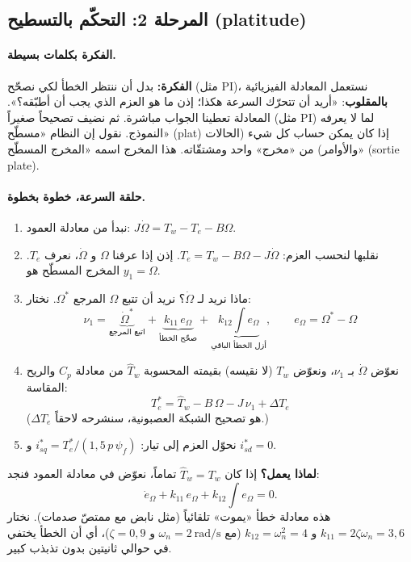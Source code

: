 \documentclass[11pt,a4paper]{article}
\newcommand{\fr}[1]{\textfrench{#1}}
\newcommand{\Fikra}{\textbf{الفكرة: }}
\begin{document}
\subsection{المرحلة 2: التحكّم بالتسطيح (\fr{platitude})}

\paragraph{الفكرة بكلمات بسيطة.}
\begin{fikra}
\Fikra
بدل أن ننتظر الخطأ لكي نصحّح (مثل \fr{PI})، نستعمل المعادلة الفيزيائية \textbf{بالمقلوب}:
«أريد أن تتحرّك السرعة هكذا؛ إذن ما هو العزم الذي يجب أن أطبّقه؟». المعادلة تعطينا الجواب مباشرة.
ثم نضيف تصحيحاً صغيراً (مثل \fr{PI}) لما لا يعرفه النموذج.
نقول إن النظام «مسطّح» (\fr{plat}) إذا كان يمكن حساب كل شيء (الحالات والأوامر) من «مخرج» واحد
ومشتقّاته. هذا المخرج اسمه «المخرج المسطّح» (\fr{sortie plate}).
\end{fikra}

\paragraph{حلقة السرعة، خطوة بخطوة.}
\begin{enumerate}
\item نبدأ من معادلة العمود: $J\dot\Omega = T_w - T_e - B\Omega$.
\item نقلبها لنحسب العزم: $T_e = T_w - B\Omega - J\dot\Omega$.
إذن إذا عرفنا $\Omega$ و $\dot\Omega$، نعرف $T_e$. المخرج المسطّح هو $y_1=\Omega$.
\item ماذا نريد لـ $\dot\Omega$؟ نريد أن تتبع $\Omega$ المرجع $\Omega^*$. نختار:
\[
\nu_1 = \underbrace{\dot\Omega^*}_{\text{اتبع المرجع}} + \underbrace{k_{11}\,e_\Omega}_{\text{صحّح الخطأ}} + \underbrace{k_{12}\!\int\! e_\Omega}_{\text{أزل الخطأ الباقي}},
\qquad e_\Omega = \Omega^* - \Omega
\]
\item نعوّض $\dot\Omega$ بـ $\nu_1$، ونعوّض $T_w$ (لا نقيسه) بقيمته المحسوبة $\hat T_w$ من معادلة $C_p$ والريح المقاسة:
\begin{equation}
\boxed{T_e^* = \hat T_w - B\,\Omega - J\,\nu_1 + \Delta T_e}
\end{equation}
($\Delta T_e$ هو تصحيح الشبكة العصبونية، سنشرحه لاحقاً.)
\item نحوّل العزم إلى تيار: $i_{sq}^* = T_e^*/(1{,}5\,p\,\psi_f)$ و $i_{sd}^*=0$.
\end{enumerate}
\textbf{لماذا يعمل؟} إذا كان $\hat T_w = T_w$ تماماً، نعوّض في معادلة العمود فنجد:
\[
\dot e_\Omega + k_{11}\,e_\Omega + k_{12}\!\int\! e_\Omega = 0 .
\]
هذه معادلة خطأ «يموت» تلقائياً (مثل نابض مع ممتصّ صدمات). نختار $k_{11}=2\zeta\omega_n=3{,}6$ و
$k_{12}=\omega_n^2=4$ (مع $\omega_n = 2\ \mathrm{rad/s}$ و $\zeta=0{,}9$)، أي أن الخطأ يختفي في حوالي ثانيتين
بدون تذبذب كبير.
\end{document}
